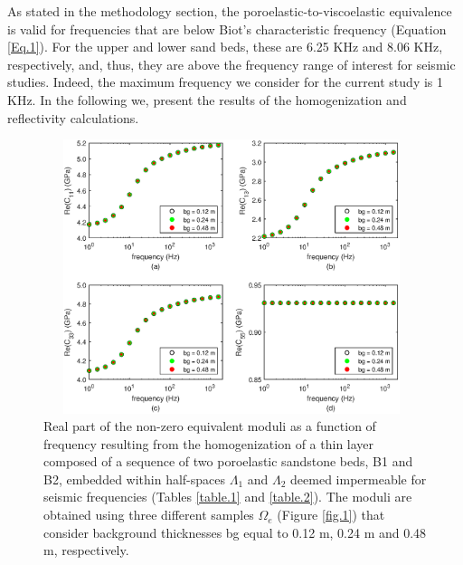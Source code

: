\documentclass[draft]{agujournal2019}
\begin{document}
As stated in the methodology section, the poroelastic-to-viscoelastic equivalence is valid for frequencies that are below Biot's characteristic frequency (Equation \eqref{Eq.1}). For the upper and lower sand beds, these are 6.25 KHz and 8.06 KHz, respectively, and, thus, they are above the frequency range of interest for seismic studies. Indeed, the maximum frequency we consider for the current study is 1 KHz. In the following we, present the results of the homogenization and reflectivity calculations.
\begin{figure}[!ht]
\centering
        \includegraphics[width=110mm, height=80mm]{Figure2.eps}
\caption{Real part of the non-zero equivalent moduli as a function of frequency resulting from the homogenization of a thin layer composed of a sequence of two poroelastic sandstone beds, B1 and B2, embedded within  half-spaces $\Lambda_1$ and $\Lambda_2$ deemed impermeable for seismic frequencies (Tables \ref{table.1} and \ref{table.2}). The moduli are obtained using three different samples $\Omega_e$ (Figure \ref{fig.1}) that consider background thicknesses bg equal to 0.12 m, 0.24 m and 0.48 m, respectively.}
\label{fig.2}
\end{figure}
\end{document}
